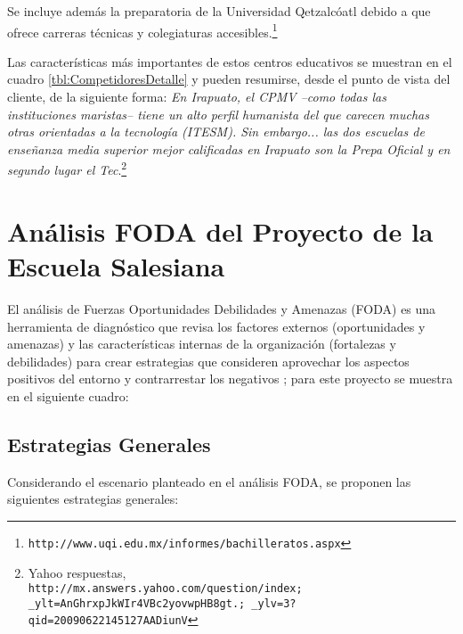 Se incluye además la preparatoria de la Universidad Qetzalcóatl debido a que ofrece carreras técnicas y colegiaturas accesibles.\footnote{\texttt{http://www.uqi.edu.mx/informes/bachilleratos.aspx}}

Las características m\'as importantes de estos centros educativos se muestran en el cuadro \ref{tbl:CompetidoresDetalle} y pueden resumirse, desde el punto de vista del cliente, de la siguiente forma: \emph{En Irapuato, el CPMV --como todas las instituciones maristas-- tiene un alto perfil humanista del que carecen muchas otras orientadas a la tecnología (ITESM). Sin embargo... las dos escuelas de enseñanza media superior mejor calificadas en Irapuato son la Prepa Oficial y en segundo lugar el Tec}.\footnote{Yahoo respuestas,\\
\texttt{http://mx.answers.yahoo.com/question/index; \_ylt=AnGhrxpJkWIr4VBc2yovwpHB8gt.; \_ylv=3?qid=20090622145127AADiunV}}







\clearpage
\section{Análisis FODA del Proyecto de la Escuela Salesiana}
\label{sec:Neg:Foda}

El análisis de Fuerzas Oportunidades Debilidades y Amenazas (FODA) es una herramienta de diagnóstico que revisa los factores externos (oportunidades y amenazas) y las características internas de la organización (fortalezas y debilidades) para crear estrategias que consideren aprovechar los aspectos positivos del entorno y contrarrestar los negativos \citep{DAVID2003}; para este proyecto se muestra en el siguiente cuadro:



\subsection{Estrategias Generales}

Considerando el escenario planteado en el análisis FODA, se proponen las siguientes estrategias generales:

